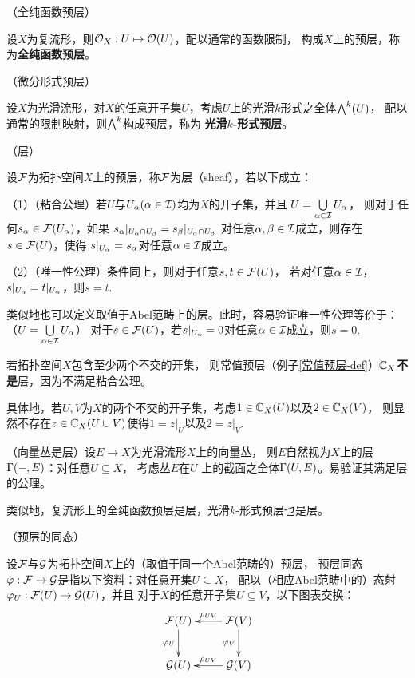 \begin{example}（全纯函数预层）

设$X$为复流形，则$\mathcal{O}_X:U\mapsto\mathcal{O}(U)$，配以通常的函数限制，
构成$X$上的预层，称为\textbf{全纯函数预层}。
\end{example}

\begin{example}（微分形式预层）

设$X$为光滑流形，对$X$的任意开子集$U$，考虑$U$上的光滑$k$形式之全体$\bigwedge\nolimits^{k}(U)$，
配以通常的限制映射，则$\bigwedge\nolimits^{k}$构成预层，称为
\textbf{光滑$k$-形式预层}。
\end{example}

\begin{definition}（层）

设$\mathcal{F}$为拓扑空间$X$上的预层，称$\mathcal{F}$为层（sheaf），若以下成立：

（1）（粘合公理）若$U$与$U_\alpha(\alpha\in\mathcal{I})$均为$X$的开子集，并且
$U=\bigcup\limits_{\alpha\in\mathcal{I}}U_\alpha$，
则对于任何$s_\alpha\in\mathcal{F}(U_\alpha)$，如果
$s_\alpha|_{U_\alpha\cap U_\beta}
=s_\beta|_{U_\alpha\cap U_\beta}$
对任意$\alpha,\beta\in\mathcal{I}$成立，则存在$s\in\mathcal{F}(U)$，使得
$s|_{U_\alpha}=s_\alpha$对任意$\alpha\in\mathcal{I}$成立。\vs

（2）（唯一性公理）条件同上，则对于任意$s,t\in\mathcal{F}(U)$，
若对任意$\alpha\in\mathcal{I}$，$s|_{U_\alpha}=t|_{U_\alpha}$，则$s=t$.
\end{definition}

类似地也可以定义取值于Abel范畴上的层。此时，容易验证唯一性公理等价于：
（$U=\bigcup\limits_{\alpha\in\mathcal{I}}U_\alpha$）
对于$s\in\mathcal{F}(U)$，若$s|_{U_\alpha}=0$对任意$\alpha\in\mathcal{I}$成立，则$s=0$.

\begin{example}若拓扑空间$X$包含至少两个不交的开集，
则常值预层（例子\ref{常值预层-def}）$\mathbb{C}_X$\textbf{不是}层，因为不满足粘合公理。
\end{example}
具体地，若$U,V$为$X$的两个不交的开子集，考虑$1\in\mathbb{C}_X(U)$以及$2\in\mathbb{C}_{X}(V)$，
则显然不存在$z\in\mathbb{C}_X(U\cup V)$使得$1=z|_{U}$以及$2=z|_{V}$.

\begin{example}（向量丛是层）设$E\to X$为光滑流形$X$上的向量丛，
则$E$自然视为$X$上的层$\Gamma(-,E)$：对任意$U\subseteq X$， 考虑丛$E$在$U$
上的截面之全体$\Gamma(U,E)$。易验证其满足层的公理。
\end{example}
类似地，复流形上的全纯函数预层是层，光滑$k$-形式预层也是层。

\begin{definition}（预层的同态）

设$\mathcal{F}$与$\mathcal{G}$为拓扑空间$X$上的（取值于同一个Abel范畴的）预层，
预层同态$\varphi:\mathcal{F}\to\mathcal{G}$是指以下资料：对任意开集$U\subseteq X$，
配以（相应Abel范畴中的）态射$\varphi_U:\mathcal{F}(U)\to\mathcal{G}(U)$，并且
对于$X$的任意开子集$U\subseteq V$，以下图表交换：
$$
  \xymatrix{
     \mcalF(U)  \ar[d]_{\fai_U}
    &\mcalF(V)  \ar[d]_{\fai_V} \ar[l]_{\rho_{UV}}
  \\
     \mcalG(U)
    &\mcalG(V)  \ar[l]_{\rho_{UV}}
  }
$$
\end{definition}


